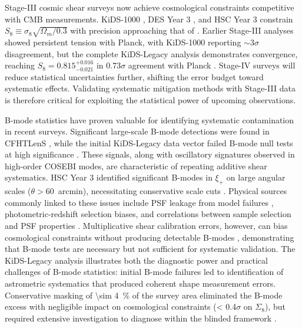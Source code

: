 \documentclass{aa}
\begin{document}
Stage-III cosmic shear surveys now achieve cosmological constraints competitive with CMB measurements. KiDS-1000 \citep{asgari.etal21}, DES Year 3 \citep{abbott.etal22}, and HSC Year 3 \citep{li.etal23} constrain $S_8 \equiv \sigma_8 \sqrt{\Omega_m/0.3}$ with precision approaching that of \citet{planck20}. Earlier Stage-III analyses showed persistent tension with Planck, with KiDS-1000 reporting $\sim 3\sigma$ disagreement, but the complete KiDS-Legacy analysis demonstrates convergence, reaching $S_8 = 0.815^{+0.016}_{-0.021}$ in \num{0.73}$\sigma$ agreement with Planck \citep{wright.etal25}. Stage-IV surveys will reduce statistical uncertainties further, shifting the error budget toward systematic effects. Validating systematic mitigation methods with Stage-III data is therefore critical for exploiting the statistical power of upcoming observations.

B-mode statistics have proven valuable for identifying systematic contamination in recent surveys. Significant large-scale B-mode detections were found in CFHTLenS \citep{asgari.etal17}, while the initial KiDS-Legacy data vector failed B-mode null tests at high significance \citep{wright.etal25}. These signals, along with oscillatory signatures observed in high-order COSEBI modes, are characteristic of repeating additive shear systematics. HSC Year 3 identified significant B-modes in $\xi_+$ on large angular scales ($\theta > 60$~arcmin), necessitating conservative scale cuts \citep{li.etal23}. Physical sources commonly linked to these issues include PSF leakage from model failures \citep{jarvis.etal16, kohlinger.etal17}, photometric-redshift selection biases, and correlations between sample selection and PSF properties \citep{asgari.etal20}. Multiplicative shear calibration errors, however, can bias cosmological constraints without producing detectable B-modes \citep{schneider.etal22}, demonstrating that B-mode tests are necessary but not sufficient for systematic validation. The KiDS-Legacy analysis illustrates both the diagnostic power and practical challenges of B-mode statistics: initial B-mode failures led to identification of astrometric systematics that produced coherent shape measurement errors. Conservative masking of \SI{\sim 4}{\percent} of the survey area eliminated the B-mode excess with negligible impact on cosmological constraints (\num{< 0.4}$\sigma$ on $\Sigma_8$), but required extensive investigation to diagnose within the blinded framework \citep{wright.etal25}.
\end{document}
